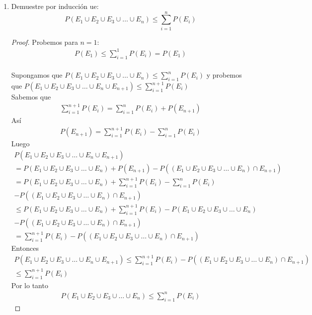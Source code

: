 \begin{enumerate}
    \item Demuestre por inducción  ue: $$P(E_1 \cup E_2 \cup E_3 \cup \ldots \cup E_n) \leq \sum_{i=1}^{n} P(E_i)$$
    \begin{proof}
        Probemos para $n=1$:
        \begin{gather*}
        P(E_1) \leq \sum_{i=1}^{1} P(E_i) = P(E_1)
        \end{gather*}
        \\Supongamos que $P(E_1 \cup E_2 \cup E_3 \cup \ldots \cup E_n) \leq \sum_{i=1}^{n} P(E_i)$ y probemos que $P(E_1 \cup E_2 \cup E_3 \cup \ldots \cup E_n \cup E_{n + 1}) \leq \sum_{i=1}^{n + 1} P(E_i)$
        \\Sabemos que
        \begin{gather*}
        \sum_{i=1}^{n + 1} P(E_i) = \sum_{i=1}^{n} P(E_i) + P(E_{n + 1})
        \end{gather*}
        Así
        \begin{gather*}
        P(E_{n + 1}) = \sum_{i=1}^{n + 1} P(E_i) - \sum_{i=1}^{n} P(E_i)
        \end{gather*}
        Luego
        \begin{gather*}
        P(E_1 \cup E_2 \cup E_3 \cup \ldots \cup E_n \cup E_{n + 1}) \\
        = P(E_1 \cup E_2 \cup E_3 \cup \ldots \cup E_n) + P(E_{n + 1}) - P((E_1 \cup E_2 \cup E_3 \cup \ldots \cup E_n) \cap E_{n + 1}) \\
        = P(E_1 \cup E_2 \cup E_3 \cup \ldots \cup E_n) + \sum_{i=1}^{n + 1} P(E_i) - \sum_{i=1}^{n} P(E_i) \\
        - P((E_1 \cup E_2 \cup E_3 \cup \ldots \cup E_n) \cap E_{n + 1}) \\
        \leq P(E_1 \cup E_2 \cup E_3 \cup \ldots \cup E_n) + \sum_{i=1}^{n + 1} P(E_i) - P(E_1 \cup E_2 \cup E_3 \cup \ldots \cup E_n) \\
        - P((E_1 \cup E_2 \cup E_3 \cup \ldots \cup E_n) \cap E_{n + 1}) \\
        = \sum_{i=1}^{n + 1} P(E_i) - P((E_1 \cup E_2 \cup E_3 \cup \ldots \cup E_n) \cap E_{n + 1})
        \end{gather*}
        Entonces
        \begin{gather*}
        P(E_1 \cup E_2 \cup E_3 \cup \ldots \cup E_n \cup E_{n + 1}) \leq \sum_{i=1}^{n + 1} P(E_i) - P((E_1 \cup E_2 \cup E_3 \cup \ldots \cup E_n) \cap E_{n + 1}) \\
        \leq \sum_{i=1}^{n + 1} P(E_i)
        \end{gather*}
    Por lo tanto
    \begin{gather*}
    P(E_1 \cup E_2 \cup E_3 \cup \ldots \cup E_n) \leq \sum_{i=1}^{n} P(E_i)
    \end{gather*}
    \end{proof}
    

\end{enumerate}
